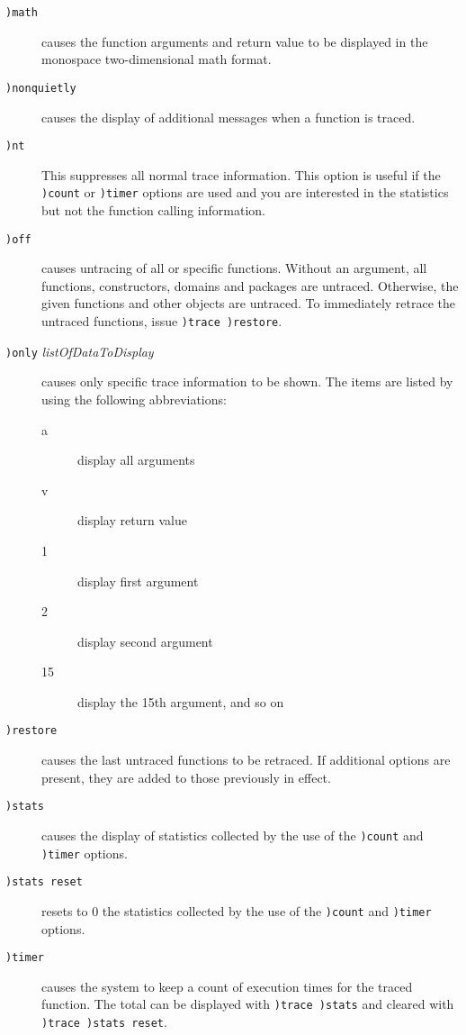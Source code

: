 {{{{{{{\begin{description}
\item[{\tt )math}]
causes the function arguments and return value to be displayed in the
\Language{} monospace two-dimensional math format.

\item[{\tt )nonquietly}]
causes the display of additional messages when a function is
traced.

\item[{\tt )nt}]
This suppresses all normal trace information.  This option is
useful if the {\tt )count} or {\tt )timer} options are used and
you are interested in the statistics but not the function calling
information.

\item[{\tt )off}]
causes untracing of all or specific functions.  Without an
argument, all functions, constructors, domains and packages are
untraced.  Otherwise, the given functions and other objects
are untraced.  To
immediately retrace the untraced functions, issue {\tt )trace
)restore}.

\item[{\tt )only} {\it listOfDataToDisplay}]
causes only specific trace information to be shown.  The items are
listed by using the following abbreviations:
\begin{description}
\item[a]        display all arguments
\item[v]        display return value
\item[1]        display first argument
\item[2]        display second argument
\item[15]       display the 15th argument, and so on
\end{description}
\end{description}
\begin{description}

\item[{\tt )restore}]
causes the last untraced functions to be retraced.  If additional
options are present, they are added to those previously in effect.

\item[{\tt )stats}]
causes the display of statistics collected by the use of the
{\tt )count} and {\tt )timer} options.

\item[{\tt )stats reset}]
resets to 0 the statistics collected by the use of the
{\tt )count} and {\tt )timer} options.

\item[{\tt )timer}]
causes the system to keep a count of execution times for the
traced function.  The total can be displayed with {\tt )trace
)stats} and cleared with {\tt )trace )stats reset}.


\end{description}}}}}}}}
